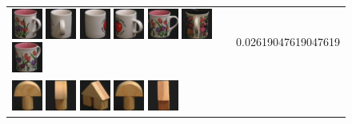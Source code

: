 {\begin{figure}[p]
\begin{tabular}{m{11cm} | m{3cm} |}
\includegraphics[width=1cm]{coil/beeld-10.eps}
\includegraphics[width=1cm]{coil/beeld-41.eps}
\includegraphics[width=1cm]{coil/beeld-38.eps}
\includegraphics[width=1cm]{coil/beeld-40.eps}
\includegraphics[width=1cm]{coil/beeld-6.eps}
\includegraphics[width=1cm]{coil/beeld-65.eps}
\includegraphics[width=1cm]{coil/beeld-9.eps}
& {\scriptsize 0.02619047619047619}
\\
\includegraphics[width=1cm]{coil/beeld-0.eps}
\includegraphics[width=1cm]{coil/beeld-2.eps}
\includegraphics[width=1cm]{coil/beeld-46.eps}
\includegraphics[width=1cm]{coil/beeld-1.eps}
\includegraphics[width=1cm]{coil/beeld-44.eps}

\end{tabular}
\end{figure}}
